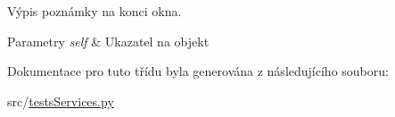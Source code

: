 Výpis poznámky na konci okna. 


\begin{DoxyParams}{Parametry}
{\em self} & Ukazatel na objekt \\
\hline
\end{DoxyParams}


Dokumentace pro tuto třídu byla generována z následujícího souboru\-:\begin{DoxyCompactItemize}
\item 
src/\hyperlink{testsServices_8py}{tests\-Services.\-py}\end{DoxyCompactItemize}

